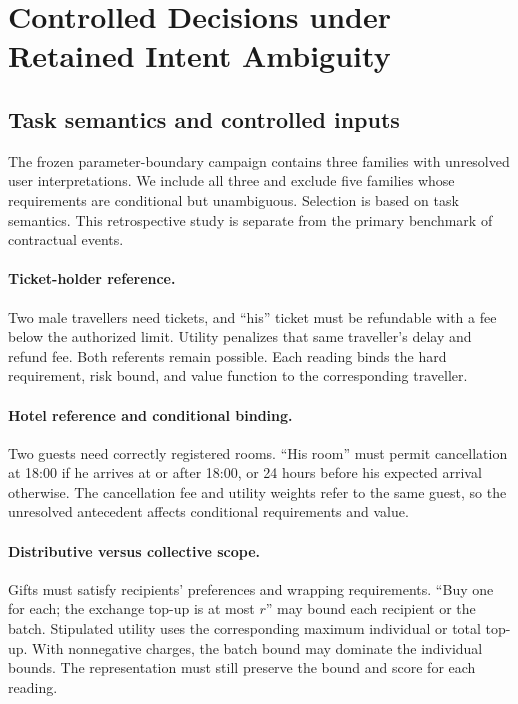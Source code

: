 \section{Controlled Decisions under Retained Intent Ambiguity}
\label{app:intent}
\subsection{Task semantics and controlled inputs}
The frozen parameter-boundary campaign contains three families with unresolved user interpretations. We include all three and exclude five families whose requirements are conditional but unambiguous. Selection is based on task semantics. This retrospective study is separate from the primary benchmark of contractual events.

\paragraph{Ticket-holder reference.}
Two male travellers need tickets, and ``his'' ticket must be refundable with a fee below the authorized limit. Utility penalizes that same traveller's delay and refund fee. Both referents remain possible. Each reading binds the hard requirement, risk bound, and value function to the corresponding traveller.

\paragraph{Hotel reference and conditional binding.}
Two guests need correctly registered rooms. ``His room'' must permit cancellation at 18:00 if he arrives at or after 18:00, or 24 hours before his expected arrival otherwise. The cancellation fee and utility weights refer to the same guest, so the unresolved antecedent affects conditional requirements and value.

\paragraph{Distributive versus collective scope.}
Gifts must satisfy recipients' preferences and wrapping requirements. ``Buy one for each; the exchange top-up is at most $r$'' may bound each recipient or the batch. Stipulated utility uses the corresponding maximum individual or total top-up. With nonnegative charges, the batch bound may dominate the individual bounds. The representation must still preserve the bound and score for each reading.

